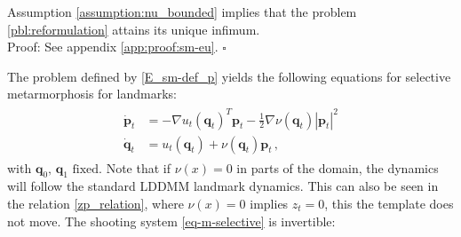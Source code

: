 \documentclass[runningheads]{llncs}
\begin{document}
\begin{theorem}\label{sm-eu}
Assumption \ref{assumption:nu_bounded} implies that the problem
\eqref{pbl:reformulation} attains its unique infimum.\\

Proof: See appendix \ref{app:proof:sm-eu}.
{\hfill $\square$}
\end{theorem}

The problem defined by \eqref{E_sm-def_p} yields the following equations for
selective metarmorphosis for landmarks:
\begin{align}
  \begin{split}
  \dot{\mathbf p}_t &= - \nabla u_t(\mathbf q_t)^T \mathbf p_t - \frac12
  \nabla \nu(\mathbf q_t ) |\mathbf p_t|^2\\ \dot{\mathbf q}_t &= u_t(\mathbf q_t) +
  \nu(\mathbf q_t)\mathbf p_t \,,
\end{split}
  \label{eq-m-selective}
\end{align}
with $\mathbf q_0,\, \mathbf q_1 \text{ fixed}$. Note that if $\nu(x)=0$ in
parts of the domain, the dynamics will follow the standard LDDMM landmark
dynamics. This can also be seen in the relation \eqref{zp_relation}, where
$\nu(x)=0$  implies $z_t=0$, this the template does not move. The shooting
system \eqref{eq-m-selective} is invertible:
\end{document}
